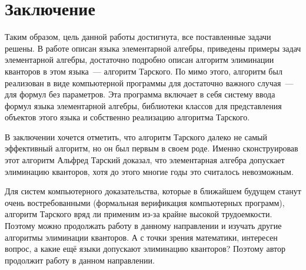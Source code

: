 \section*{Заключение}

	Таким образом, цель данной работы достигнута, все поставленные задачи решены. В работе описан языка элементарной алгебры, приведены примеры задач элементарной алгебры, достаточно подробно описан алгоритм элиминации кванторов в этом языка~--- алгоритм Тарского. По мимо этого, алгоритм был реализован в виде компьютерной программы для достаточно важного случая~--- для формул без параметров. Эта программа включает в себя систему ввода формул языка элементарной алгебры, библиотеки классов для представления объектов этого языка и собственно реализацию алгоритма Тарского.

	В заключении хочется отметить, что алгоритм Тарского далеко не самый эффективный алгоритм, но он был первым в своем роде. Именно сконструировав этот алгоритм Альфред Тарский доказал, что элементарная алгебра допускает элиминацию кванторов, хотя до этого многие годы это считалось невозможным. 
	
	Для систем компьютерного доказательства, которые в ближайшем будущем станут очень востребованными (формальная верификация компьютерных программ), алгоритм Тарского вряд ли применим из-за крайне высокой трудоемкости. Поэтому можно продолжать работу в данному направлении и изучать другие алгоритмы элиминации кванторов. А с точки зрения математики, интересен вопрос, а какие ещё языки допускают элиминацию кванторов? Поэтому автор продолжит работу в данном направлении.